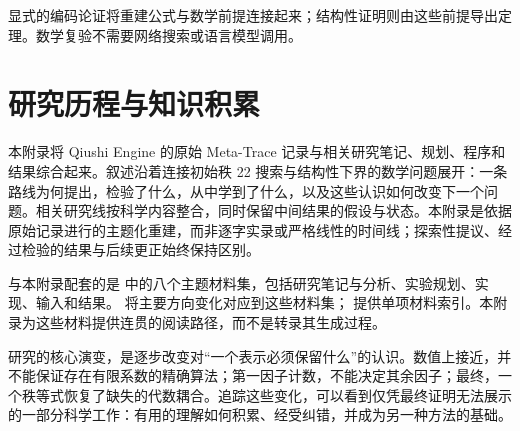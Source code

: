 \documentclass[11pt,a4paper]{article}
\begin{document}
显式的编码论证将重建公式与数学前提连接起来；结构性证明则由这些前提导出定理。数学复验不需要网络搜索或语言模型调用。

\FloatBarrier
\clearpage
\section{研究历程与知识积累}\label{app:research-record}

本附录将 Qiushi Engine 的原始 Meta-Trace 记录与相关研究笔记、规划、程序和结果综合起来。叙述沿着连接初始秩 22 搜索与结构性下界的数学问题展开：一条路线为何提出，检验了什么，从中学到了什么，以及这些认识如何改变下一个问题。相关研究线按科学内容整合，同时保留中间结果的假设与状态。本附录是依据原始记录进行的主题化重建，而非逐字实录或严格线性的时间线；探索性提议、经过检验的结果与后续更正始终保持区别。

与本附录配套的是  中的八个主题材料集，包括研究笔记与分析、实验规划、实现、输入和结果。 将主要方向变化对应到这些材料集； 提供单项材料索引。本附录为这些材料提供连贯的阅读路径，而不是转录其生成过程。

研究的核心演变，是逐步改变对“一个表示必须保留什么”的认识。数值上接近，并不能保证存在有限系数的精确算法；第一因子计数，不能决定其余因子；最终，一个秩等式恢复了缺失的代数耦合。追踪这些变化，可以看到仅凭最终证明无法展示的一部分科学工作：有用的理解如何积累、经受纠错，并成为另一种方法的基础。


\FloatBarrier

\FloatBarrier
{}
{}
\ifQiushiHasCitations
\fi
\end{document}
